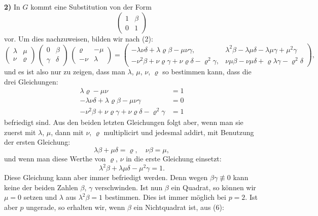 \documentclass[12pt,a4paper]{article}
\begin{document}
\medskip\noindent
\textbf{2)} In $G$ kommt eine Substitution von der Form
\[
\begin{pmatrix}1&\beta\\0&1\end{pmatrix}
\]
vor. Um dies nachzuweisen, bilden wir nach (2):
\begin{equation}\label{eq:66.4}
\tag{4}
\begin{pmatrix}\lambda&\mu\\\nu&\varrho\end{pmatrix}\,
\begin{pmatrix}0&\beta\\\gamma&\delta\end{pmatrix}\,
\begin{pmatrix}\varrho&-\mu\\-\nu&\lambda\end{pmatrix}
=
\begin{pmatrix}
-\lambda\nu\delta + \lambda\varrho\beta - \mu\nu\gamma,&
\lambda^{2}\beta - \lambda\mu\delta - \lambda\mu\gamma + \mu^{2}\gamma\\
-\nu^{2}\beta + \nu\varrho\gamma + \nu\varrho\delta - \varrho^{2}\gamma,&
\nu\mu\beta - \nu\mu\delta + \varrho\lambda\gamma - \varrho^{2}\delta
\end{pmatrix},
\end{equation}
und es ist also nur zu zeigen, dass man $\lambda$, $\mu$, $\nu$, $\varrho$ so bestimmen kann, dass die drei Gleichungen:
\[
\begin{aligned}
\lambda\varrho - \mu\nu &= 1\\
-\lambda\nu\delta + \lambda\varrho\beta - \mu\nu\gamma &= 0\\
-\nu^{2}\beta + \nu\varrho\gamma + \nu\varrho\delta - \varrho^{2}\gamma &= 1
\end{aligned}
\]
befriedigt sind. Aus den beiden letzten Gleichungen folgt aber, wenn man sie zuerst mit $\lambda$, $\mu$, dann mit $\nu$, $\varrho$ multiplicirt und jedesmal addirt, mit Benutzung der ersten Gleichung:
\begin{equation}\label{eq:66.5}
\tag{5}
\lambda\beta + \mu\delta = \varrho,\quad \nu\beta = \mu,
\end{equation}
und wenn man diese Werthe von $\varrho$, $\nu$ in die erste Gleichung einsetzt:
\begin{equation}\label{eq:66.6}
\tag{6}
\lambda^{2}\beta + \lambda\mu\delta - \mu^{2}\gamma = 1.
\end{equation}
Diese Gleichung kann aber immer befriedigt werden. Denn wegen $\beta\gamma \not\equiv 0$ kann keine der beiden Zahlen $\beta$, $\gamma$ verschwinden. Ist nun $\beta$ ein Quadrat, so können wir $\mu = 0$ setzen und $\lambda$ aus $\lambda^{2}\beta = 1$ bestimmen. Dies ist immer möglich bei $p = 2$. Ist aber $p$ ungerade, so erhalten wir, wenn $\beta$ ein Nichtquadrat ist, aus (6):
\end{document}
